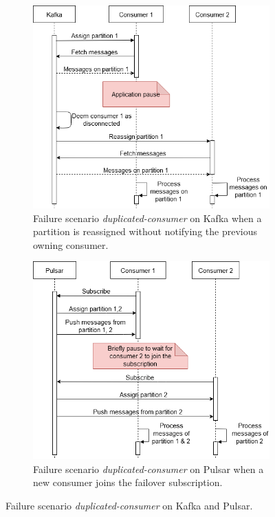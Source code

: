 \begin{figure}[t!]
	\begin{adjustwidth}{-2cm}{-2cm}
	\centering

	\begin{subfigure}[t]{0.49\linewidth}
		\centering
		\includegraphics[width=\linewidth]{images/kafka-duplicated-scenario.png}
		\caption{Failure scenario \emph{duplicated-consumer} on Kafka when a partition is reassigned without notifying the previous owning consumer.}
		\label{fig:kafkascenario1}
	\end{subfigure}
	\begin{subfigure}[t]{0.49\linewidth}
		\centering
		\includegraphics[width=\linewidth]{images/pulsar-duplicated-scenario.png}
		\caption{Failure scenario \emph{duplicated-consumer} on Pulsar when a new consumer joins the failover subscription.}
		\label{fig:pulsarscenario1}
	\end{subfigure}
\end{adjustwidth}
	\caption{Failure scenario \emph{duplicated-consumer} on Kafka and Pulsar.}
	\label{fig:failurescenario}
\end{figure}
